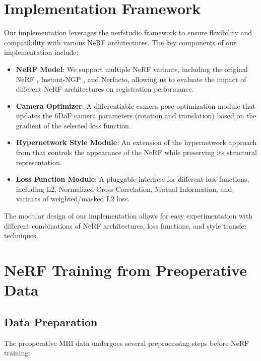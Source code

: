 \section{Implementation Framework}

Our implementation leverages the nerfstudio framework to ensure flexibility and compatibility with various NeRF architectures. The key components of our implementation include:

\begin{itemize}
    \item \textbf{NeRF Model}: We support multiple NeRF variants, including the original NeRF \parencite{mildenhall2020nerf}, Instant-NGP \parencite{muller2022instant}, and Nerfacto, allowing us to evaluate the impact of different NeRF architectures on registration performance.
    
    \item \textbf{Camera Optimizer}: A differentiable camera pose optimization module that updates the 6DoF camera parameters (rotation and translation) based on the gradient of the selected loss function.
    
    \item \textbf{Hypernetwork Style Module}: An extension of the hypernetwork approach from \textcite{fehrentz2024intraoperative} that controls the appearance of the NeRF while preserving its structural representation.
    
    \item \textbf{Loss Function Module}: A pluggable interface for different loss functions, including L2, Normalized Cross-Correlation, Mutual Information, and variants of weighted/masked L2 loss.
\end{itemize}

The modular design of our implementation allows for easy experimentation with different combinations of NeRF architectures, loss functions, and style transfer techniques.

\section{NeRF Training from Preoperative Data}

\subsection{Data Preparation}

The preoperative MRI data undergoes several preprocessing steps before NeRF training:

